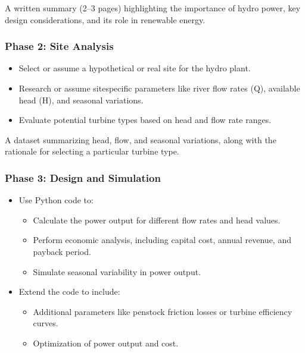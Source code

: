 \documentclass[letterpaper,10pt,english]{jupyterBook}
\begin{document}
\sphinxAtStartPar
{} A written summary (2–3 pages) highlighting the
importance of hydro power, key design considerations, and its role in
renewable energy.


\subsubsection{Phase 2: Site Analysis}
\label{\detokenize{ProjectInstructions:phase-2-site-analysis}}
\sphinxAtStartPar
{}
\begin{itemize}
\item {} 
\sphinxAtStartPar
Select or assume a hypothetical or real site for the hydro plant.

\item {} 
\sphinxAtStartPar
Research or assume site\sphinxhyphen{}specific parameters like river flow rates
(Q), available head (H), and seasonal variations.

\item {} 
\sphinxAtStartPar
Evaluate potential turbine types based on head and flow rate ranges.

\end{itemize}

\sphinxAtStartPar
{} A dataset summarizing head, flow, and seasonal
variations, along with the rationale for selecting a particular turbine
type.


\subsubsection{Phase 3: Design and Simulation}
\label{\detokenize{ProjectInstructions:phase-3-design-and-simulation}}
\sphinxAtStartPar
{}
\begin{itemize}
\item {} 
\sphinxAtStartPar
Use Python code to:
\begin{itemize}
\item {} 
\sphinxAtStartPar
Calculate the power output for different flow rates and head
values.

\item {} 
\sphinxAtStartPar
Perform economic analysis, including capital cost, annual
revenue, and payback period.

\item {} 
\sphinxAtStartPar
Simulate seasonal variability in power output.

\end{itemize}

\item {} 
\sphinxAtStartPar
Extend the code to include:
\begin{itemize}
\item {} 
\sphinxAtStartPar
Additional parameters like penstock friction losses or turbine
efficiency curves.

\item {} 
\sphinxAtStartPar
Optimization of power output and cost.

\end{itemize}

\end{itemize}
\end{document}
